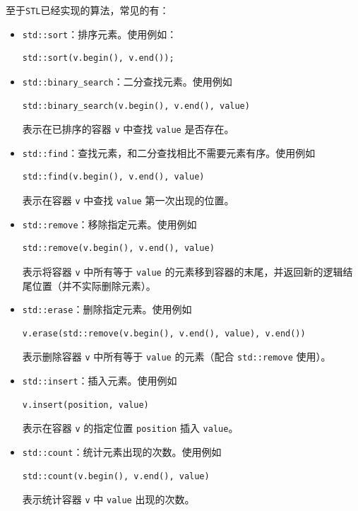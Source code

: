 \documentclass{article}
\begin{document}
至于\texttt{STL}已经实现的算法，常见的有：
\begin{itemize}
  \item \texttt{std::sort}：排序元素。使用例如：
    \begin{lstlisting}
std::sort(v.begin(), v.end());
    \end{lstlisting}

  \item \texttt{std::binary\_search}：二分查找元素。使用例如
    \begin{lstlisting}
std::binary_search(v.begin(), v.end(), value)
    \end{lstlisting}
    表示在已排序的容器 \texttt{v} 中查找 \texttt{value} 是否存在。

  \item \texttt{std::find}：查找元素，和二分查找相比不需要元素有序。使用例如
    \begin{lstlisting}
std::find(v.begin(), v.end(), value)
    \end{lstlisting}
    表示在容器 \texttt{v} 中查找 \texttt{value} 第一次出现的位置。

  \item \texttt{std::remove}：移除指定元素。使用例如
    \begin{lstlisting}
std::remove(v.begin(), v.end(), value)
    \end{lstlisting}
    表示将容器 \texttt{v} 中所有等于 \texttt{value} 的元素移到容器的末尾，并返回新的逻辑结尾位置（并不实际删除元素）。

  \item \texttt{std::erase}：删除指定元素。使用例如
    \begin{lstlisting}
v.erase(std::remove(v.begin(), v.end(), value), v.end())
    \end{lstlisting}
    表示删除容器 \texttt{v} 中所有等于 \texttt{value} 的元素（配合 \texttt{std::remove} 使用）。

  \item \texttt{std::insert}：插入元素。使用例如
    \begin{lstlisting}
v.insert(position, value)
    \end{lstlisting}
    表示在容器 \texttt{v} 的指定位置 \texttt{position} 插入 \texttt{value}。

  \item \texttt{std::count}：统计元素出现的次数。使用例如
    \begin{lstlisting}
std::count(v.begin(), v.end(), value)
    \end{lstlisting}
    表示统计容器 \texttt{v} 中 \texttt{value} 出现的次数。


\end{itemize}
\end{document}
